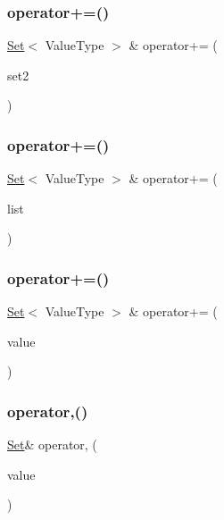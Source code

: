 \subsubsection{\texorpdfstring{operator+=()}{operator+=()}\hspace{0.1cm}{\footnotesize\ttfamily [1/3]}}
{\footnotesize\ttfamily \mbox{\hyperlink{classSet}{Set}}$<$ Value\+Type $>$ \& operator+= (\begin{DoxyParamCaption}\item[{const \mbox{\hyperlink{classSet}{Set}}$<$ Value\+Type $>$ \&}]{set2 }\end{DoxyParamCaption})}

\mbox{\label{classSet_a360b68eb88d08e6a51a4c78a6c6cef2f}} 
\subsubsection{\texorpdfstring{operator+=()}{operator+=()}\hspace{0.1cm}{\footnotesize\ttfamily [2/3]}}
{\footnotesize\ttfamily \mbox{\hyperlink{classSet}{Set}}$<$ Value\+Type $>$ \& operator+= (\begin{DoxyParamCaption}\item[{std\+::initializer\+\_\+list$<$ Value\+Type $>$}]{list }\end{DoxyParamCaption})}

\mbox{\label{classSet_aa48c02af8af47699d2eb4306b10c44d1}} 
\subsubsection{\texorpdfstring{operator+=()}{operator+=()}\hspace{0.1cm}{\footnotesize\ttfamily [3/3]}}
{\footnotesize\ttfamily \mbox{\hyperlink{classSet}{Set}}$<$ Value\+Type $>$ \& operator+= (\begin{DoxyParamCaption}\item[{const Value\+Type \&}]{value }\end{DoxyParamCaption})}

\mbox{\label{classSet_a3d81d8a5397c6fe2c6eb5fc1a4029922}} 
\subsubsection{\texorpdfstring{operator,()}{operator,()}}
{\footnotesize\ttfamily \mbox{\hyperlink{classSet}{Set}}\& operator, (\begin{DoxyParamCaption}\item[{const Value\+Type \&}]{value }\end{DoxyParamCaption})\hspace{0.3cm}{\ttfamily [inline]}}

